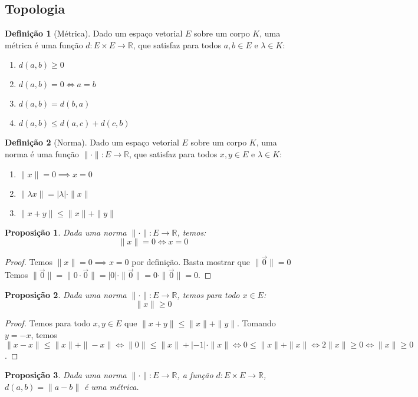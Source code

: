 \documentclass{article}
\theoremstyle{plain}
\newtheorem{prop}{Proposição}[section]
\theoremstyle{definition}
\newtheorem{definicao}{Definição}[section]
\theoremstyle{remark}
\begin{document}
\subsection{Topologia}
\begin{definicao}[Métrica]
	Dado um espaço vetorial $E$ sobre um corpo $K$, uma métrica é uma função $d: E\times E \to \mathbb{R}$, que satisfaz para todos $a,b\in E$ e $\lambda \in K$:
	\begin{enumerate}
		\item $d(a,b) \geq 0$
		\item $d(a,b) = 0 \iff a = b $
		\item $d(a,b) = d(b,a)$
		\item $ d(a,b) \leq d(a,c) + d(c,b)$
	\end{enumerate}
\end{definicao}
\begin{definicao}[Norma]
	Dado um espaço vetorial $E$ sobre um corpo $K$, uma norma é uma função $\| \cdot \|: E \to \mathbb{R}$, que satisfaz para todos $x,y\in E$ e $\lambda \in K$:

	\begin{enumerate}
		\item $\| x \| = 0 \implies x = 0 $
		\item $\| \lambda x \| = | \lambda | \cdot \| x \|$
		\item $ \| x+y \| \leq \| x \| + \| y \|$
	\end{enumerate}
\end{definicao}
\begin{prop}
	Dada uma norma $\| \cdot \|: E \to \mathbb{R}$, temos:
	$$ \| x\| = 0 \iff x = 0 $$
\end{prop}
\begin{proof}
	Temos $\| x \| =0 \implies x = 0$ por definição. Basta mostrar que $\| \vec{0} \| = 0 $
	Temos $\| \vec{0} \| = \| 0 \cdot \vec{0} \|  = |0| \cdot \| \vec{0} \| = 0 \cdot \|\vec{0} \| = 0$.
\end{proof}
\begin{prop}
	Dada uma norma $\| \cdot \|: E \to \mathbb{R}$, temos para todo $x\in E$:
	$$ \|x \| \geq 0 $$
\end{prop}
\begin{proof}
	Temos para todo $x,y \in E$ que $\| x+y\| \leq \|x \| + \| y \|$.  Tomando $y = - x$, temos $\| x-x\| \leq \| x\| + \| -x\| \iff \|0 \| \leq \|x\| + |-1| \cdot \| x\| \iff 0 \leq \|x\| + \|x\| \iff 2\|x\| \geq 0 \iff \|x\| \geq 0$.
\end{proof}
\begin{prop}
	Dada uma norma $\| \cdot \|: E \to \mathbb{R}$, a função $d: E\times E \to \mathbb{R}$, $d(a,b) = \| a-b\|$ é uma métrica.
\end{prop}
\end{document}
